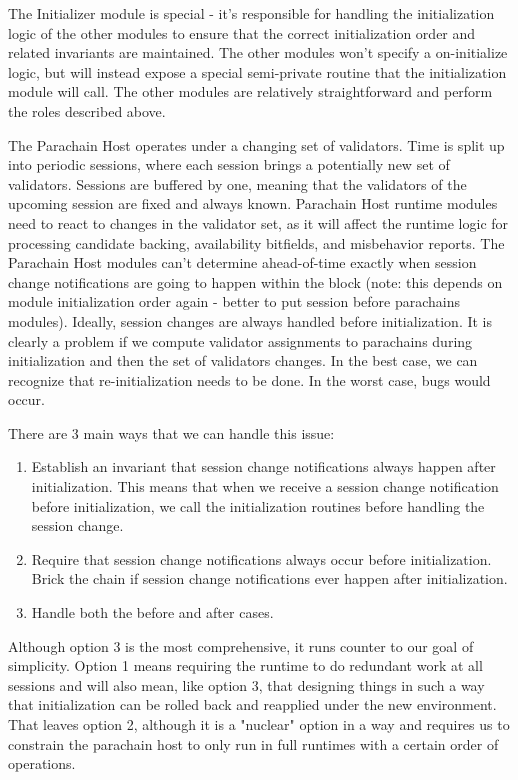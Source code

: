 The Initializer module is special - it's responsible for handling the
initialization logic of the other modules to ensure that the correct
initialization order and related invariants are maintained. The other modules
won't specify a on-initialize logic, but will instead expose a special
semi-private routine that the initialization module will call. The other modules
are relatively straightforward and perform the roles described above.
\newline

The Parachain Host operates under a changing set of validators. Time is split up
into periodic sessions, where each session brings a potentially new set of
validators. Sessions are buffered by one, meaning that the validators of the
upcoming session are fixed and always known. Parachain Host runtime modules need
to react to changes in the validator set, as it will affect the runtime logic
for processing candidate backing, availability bitfields, and misbehavior
reports. The Parachain Host modules can't determine ahead-of-time exactly when
session change notifications are going to happen within the block (note: this
depends on module initialization order again - better to put session before
parachains modules). Ideally, session changes are always handled before
initialization. It is clearly a problem if we compute validator assignments to
parachains during initialization and then the set of validators changes. In the
best case, we can recognize that re-initialization needs to be done. In the
worst case, bugs would occur.
\newline

There are 3 main ways that we can handle this issue:

\begin{enumerate}
    \item Establish an invariant that session change notifications always happen
    after initialization. This means that when we receive a session change
    notification before initialization, we call the initialization routines
    before handling the session change.
    \item Require that session change notifications always occur before
    initialization. Brick the chain if session change notifications ever happen
    after initialization.
    \item Handle both the before and after cases.
\end{enumerate}

Although option 3 is the most comprehensive, it runs counter to our goal of
simplicity. Option 1 means requiring the runtime to do redundant work at all
sessions and will also mean, like option 3, that designing things in such a way
that initialization can be rolled back and reapplied under the new environment.
That leaves option 2, although it is a "nuclear" option in a way and requires us
to constrain the parachain host to only run in full runtimes with a certain
order of operations.
\newline

